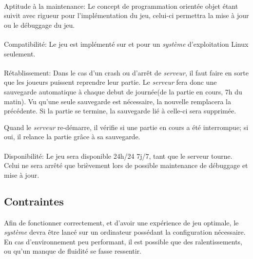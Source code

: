 \documentclass[a4paper,11pt]{report}
\begin{document}
\paragraph{}Aptitude à la maintenance:  \newline
Le concept de programmation orientée objet étant suivit avec rigueur pour l’implémentation du jeu, celui-ci permettra la mise à jour ou le débuggage du jeu.

\paragraph{}Compatibilité:  \newline
Le jeu est implémenté sur et pour un \textit{système} d'exploitation Linux seulement.

\paragraph{}Rétablissement:  \newline
Dans le cas d'un crash ou d'arrêt de \textit{serveur}, il faut faire en sorte que les joueurs puissent reprendre leur partie. Le \textit{serveur} fera donc une sauvegarde automatique à chaque debut de journée(de la partie en cours, 7h du matin). 
Vu qu'une seule sauvegarde est nécessaire, la nouvelle remplacera la précédente.
Si la partie se termine, la sauvegarde lié à celle-ci sera supprimée.

Quand le \textit{serveur} re-démarre, il vérifie si une partie en cours a été interrompue; si oui, il relance la partie grâce à sa sauvegarde.

\paragraph{}Disponibilité:  \newline
Le jeu sera disponible 24h/24 7j/7, tant que le serveur tourne. Celui ne sera arrêté que brièvement lors de possible maintenance de débuggage et mise à jour.

\subsection{Contraintes}
\paragraph{}
Afin de fonctionner correctement, et d’avoir une expérience de jeu optimale, le \textit{système} devra être lancé sur un ordinateur possédant la configuration nécessaire.
En cas d’environnement peu performant, il est possible que des ralentissements, ou qu’un manque de fluidité se fasse ressentir.
\end{document}
